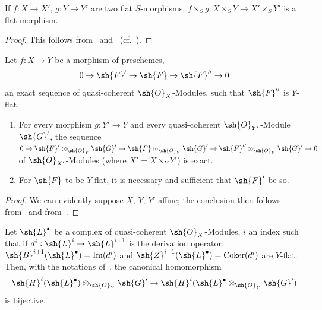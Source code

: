 \begin{corollary}[2.1.7]
\label{IV.2.1.7}
If $f:X\to X'$, $g:Y\to Y'$ are two flat $S$-morphisms, $f\times_S g:X\times_S Y\to X'\times_S Y'$ is a flat morphism.
\end{corollary}

\begin{proof}
This follows from~ and~ (cf.~).
\end{proof}

\begin{proposition}[2.1.8]
\label{IV.2.1.8}
Let $f:X\to Y$ be a morphism of preschemes,
\[
  0 \to \sh{F}' \to \sh{F} \to \sh{F}'' \to 0
\]
an exact sequence of quasi-coherent $\sh{O}_X$-Modules, such that $\sh{F}''$ is $Y$-flat.
\begin{enumerate}[label=(\roman*)]
  \item For every morphism $g:Y'\to Y$ and every quasi-coherent $\sh{O}_{Y'}$-Module $\sh{G}'$, the sequence
    $0\to\sh{F}'\otimes_{\sh{O}_Y}\sh{G}'\to\sh{F}\otimes_{\sh{O}_Y}\sh{G}'\to\sh{F}''\otimes_{\sh{O}_Y}\sh{G}'\to 0$ of $\sh{O}_{X'}$-Modules \textnormal{(}where $X'=X\times_Y Y'$\textnormal{)} is exact.
  \item For $\sh{F}$ to be $Y$-flat, it is necessary and sufficient that $\sh{F}'$ be so.
\end{enumerate}
\end{proposition}

\begin{proof}
We can evidently suppose $X$, $Y$, $Y'$ affine; the conclusion then follows from~ and from~.
\end{proof}

\begin{corollary}[2.1.9]
\label{IV.2.1.9}
Let $\sh{L}^\bullet$ be a complex of quasi-coherent $\sh{O}_X$-Modules, $i$ an index such that if $d^i:\sh{L}^i\to\sh{L}^{i+1}$ is the derivation operator, $\sh{B}^{i+1}(\sh{L}^\bullet)=\operatorname{Im}(d^i)$ and $\sh{Z}^{i+1}(\sh{L}^\bullet)=\operatorname{Coker}(d^i)$ are $Y$-flat.
Then, with the notations of~, the canonical homomorphism
\[
  \sh{H}^i(\sh{L}^\bullet)\otimes_{\sh{O}_Y}\sh{G}' \to \sh{H}^i(\sh{L}^\bullet\otimes_{\sh{O}_Y}\sh{G}')
\]
is bijective.
\end{corollary}

